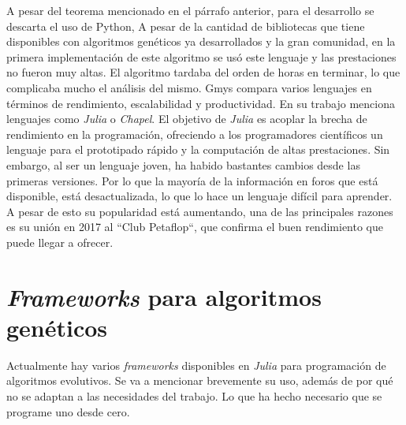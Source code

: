 A pesar del teorema mencionado en el párrafo anterior, para el desarrollo se descarta el uso de Python, A pesar de la cantidad de bibliotecas que tiene disponibles con algoritmos 
genéticos ya desarrollados y la gran comunidad, en la primera implementación de este algoritmo se usó este lenguaje \cite{merelo_molina_2021} y las prestaciones no fueron muy altas. 
El algoritmo tardaba del orden de horas en terminar, lo que complicaba mucho el análisis del mismo. Gmys \cite{comparative_study} compara varios lenguajes en términos de rendimiento, 
escalabilidad y productividad. En su trabajo menciona lenguajes como \emph{Julia} o \emph{Chapel}. El objetivo de \emph{Julia} es acoplar la brecha de rendimiento en la programación, 
ofreciendo a los programadores científicos un lenguaje para el prototipado rápido y la computación de altas prestaciones. Sin embargo, al ser un lenguaje joven, ha habido bastantes
cambios desde las primeras versiones. Por lo que la mayoría de la información en foros que está disponible, está desactualizada, lo que lo hace un lenguaje difícil para aprender.
A pesar de esto su popularidad está aumentando, una de las principales razones es su unión en 2017 al ``Club Petaflop``, que confirma el buen rendimiento que puede llegar a ofrecer.  

\section{\textit{Frameworks} para algoritmos genéticos}

Actualmente hay varios \emph{frameworks} disponibles en \emph{Julia} para programación de algoritmos evolutivos. Se va a mencionar brevemente su uso, además de por qué no
se adaptan a las necesidades del trabajo. Lo que ha hecho necesario que se programe uno desde cero.

